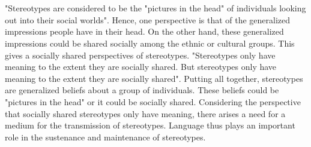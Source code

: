 \\
\\
"Stereotypes are considered to be the "pictures in the head" of individuals looking out into their social worlds"\cite{macrae1996stereotypes}. Hence, one perspective is that of the generalized impressions people have in their head. On the other hand, these generalized impressions could be shared socially among the ethnic or cultural groups. This gives a socially shared perspectives of stereotypes. "Stereotypes only have meaning to the extent they are socially shared. But stereotypes only have meaning to the extent they are socially shared"\cite{macrae1996stereotypes}. Putting all together, stereotypes are generalized beliefs about a group of individuals. These beliefs could be "pictures in the head" or it could be socially shared. Considering the perspective that socially shared stereotypes only have meaning, there arises a need for a medium for the transmission of stereotypes. Language thus plays an important role in the sustenance and maintenance of stereotypes\cite{macrae1996stereotypes}.



